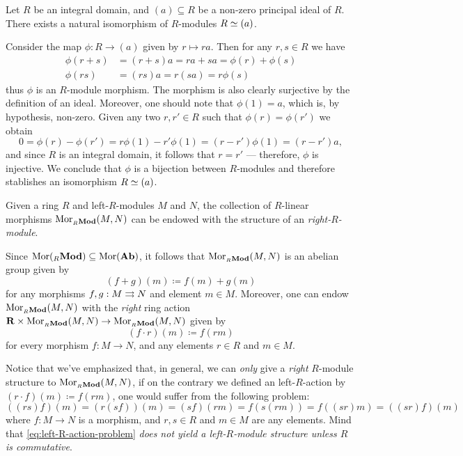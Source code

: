 \begin{example}
\label{exp:int-dom-iso-principal-ideal-R-mod}
Let \(R\) be an integral domain, and \((a) \subseteq R\) be a non-zero principal
ideal of \(R\). There exists a natural isomorphism of \(R\)-modules
\(R \simeq (a)\).

Consider the map \(\phi: R \to (a)\) given by \(r \mapsto r a\). Then for any
\(r, s \in R\) we have
\begin{align*}
  \phi(r + s) &= (r + s) a = r a + s a = \phi(r) + \phi(s) \\
  \phi(r s)   &= (r s) a = r (s a) = r \phi(s)
\end{align*}
thus \(\phi\) is an \(R\)-module morphism. The morphism is also clearly
surjective by the definition of an ideal. Moreover, one should note that
\(\phi(1) = a\), which is, by hypothesis, non-zero. Given any two
\(r, r' \in R\) such that \(\phi(r) = \phi(r')\) we obtain
\[
0 = \phi(r) - \phi(r') = r \phi(1) - r' \phi(1) = (r - r') \phi(1)
= (r - r') a,
\]
and since \(R\) is an integral domain, it follows that \(r = r'\) --- therefore,
\(\phi\) is injective. We conclude that \(\phi\) is a bijection between
\(R\)-modules and therefore stablishes an isomorphism \(R \simeq (a)\).
\end{example}

\begin{example}
\label{exp:R-mod-hom-set-is-module}
Given a ring \(R\) and left-\(R\)-modules \(M\) and \(N\), the
collection of \(R\)-linear morphisms \(\operatorname{Mor}_{{{}_{R}\textbf{Mod}}}(M, N)\) can be endowed
with the structure of an \emph{right-\(R\)-module}.

Since \(\operatorname{Mor}({{}_{R}\textbf{Mod}}) \subseteq \operatorname{Mor}({\textbf{Ab}})\), it follows that
\(\operatorname{Mor}_{{{}_{R}\textbf{Mod}}}(M, N)\) is an abelian group given by
\[
(f + g)(m) \coloneq f(m) + g(m)
\]
for any morphisms \(f, g: M \rightrightarrows N\) and element \(m \in M\). Moreover, one can
endow \(\operatorname{Mor}_{{{}_{R}\textbf{Mod}}}(M, N)\) with the \emph{right} ring action
\(\mathbf{R} \times \operatorname{Mor}_{{{}_{R}\textbf{Mod}}}(M, N) \to \operatorname{Mor}_{{{}_{R}\textbf{Mod}}}(M, N)\) given by
\[
(f \cdot r)(m) \coloneq f(r m)
\]
for every morphism \(f: M \to N\), and any elements \(r \in R\) and \(m \in M\).

Notice that we've emphasized that, in general, we can \emph{only} give a
\emph{right} \(R\)-module structure to \(\operatorname{Mor}_{{{}_{R}\textbf{Mod}}}(M, N)\), if on the
contrary we defined an left-\(R\)-action by \((r \cdot f)(m) \coloneq f(r m)\),
one would suffer from the following problem:
\begin{equation}\label{eq:left-R-action-problem}
((r s) f)(m) = (r(s f))(m) = (s f)(r m) = f(s (r m)) = f((s r) m) = ((s r) f)(m)
\end{equation}
where \(f: M \to N\) is a morphism, and \(r, s \in R\) and \(m \in M\) are any
elements. Mind that \cref{eq:left-R-action-problem} \emph{does not yield a
left-\(R\)-module structure unless \(R\) is commutative}.
\end{example}

